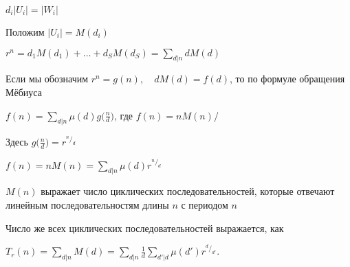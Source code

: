 $ d_i |U_i| = |W_i|  $

Положим $|U_i| = M(d_i)$

$ r^n = d_1M(d_1)+\dots + d_S M(d_S) = \sum \limits _{d|n} dM(d) $

Если мы обозначим $r^n = g(n), \quad dM(d) = f(d)$, то по формуле обращения Мёбиуса 

$
f(n) = \sum \limits _{d|n} \mu(d)g\bigg(\frac n d\bigg) $, где $f(n) = nM(n)$/

Здесь $\displaystyle g\bigg(\frac n d \bigg) =  r ^ {^n/_d}$


$\displaystyle
f(n) = n M(n) =  \sum \limits _{d|n} \mu(d) r ^ {^n/_d}
$

$M(n)$ выражает число циклических последовательностей, которые отвечают линейным последовательностям длины $n$ с периодом $n$ 

Число же всех циклических последовательностей выражается, как 

$\displaystyle
T_r(n) = \sum \limits _{d|n} M(d) = \sum \limits _{d|n} \frac 1 d \sum \limits _{d'|d} \mu(d')r^{^d/_{d'}} 
$.

